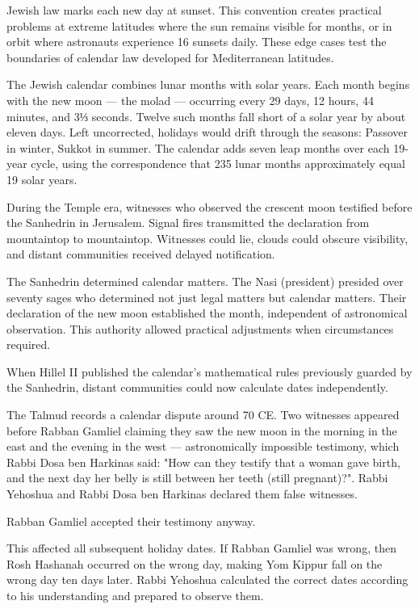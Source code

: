 Jewish law marks each new day at sunset. This convention creates practical problems at extreme latitudes where the sun remains visible for months, or in orbit where astronauts experience 16 sunsets daily. These edge cases test the boundaries of calendar law developed for Mediterranean latitudes.

The Jewish calendar combines lunar months with solar years. Each month begins with the new moon — the molad — occurring every 29 days, 12 hours, 44 minutes, and 3⅓ seconds. Twelve such months fall short of a solar year by about eleven days. Left uncorrected, holidays would drift through the seasons: Passover in winter, Sukkot in summer. The calendar adds seven leap months over each 19-year cycle, using the correspondence that 235 lunar months approximately equal 19 solar years.

During the Temple era, witnesses who observed the crescent moon testified before the Sanhedrin in Jerusalem. Signal fires transmitted the declaration from mountaintop to mountaintop. Witnesses could lie, clouds could obscure visibility, and distant communities received delayed notification.

The Sanhedrin determined calendar matters. The Nasi (president) presided over seventy sages who determined not just legal matters but calendar matters. Their declaration of the new moon established the month, independent of astronomical observation. This authority allowed practical adjustments when circumstances required.

When Hillel II published the calendar's mathematical rules previously guarded by the Sanhedrin, distant communities could now calculate dates independently. 

The Talmud records a calendar dispute around 70 CE. Two witnesses appeared before Rabban Gamliel claiming they saw the new moon in the morning in the east and the evening in the west — astronomically impossible testimony, which Rabbi Dosa ben Harkinas said: "How can they testify that a woman gave birth, and the next day her belly is still between her teeth (still pregnant)?". Rabbi Yehoshua and Rabbi Dosa ben Harkinas declared them false witnesses.

Rabban Gamliel accepted their testimony anyway.

This affected all subsequent holiday dates. If Rabban Gamliel was wrong, then Rosh Hashanah occurred on the wrong day, making Yom Kippur fall on the wrong day ten days later. Rabbi Yehoshua calculated the correct dates according to his understanding and prepared to observe them.


